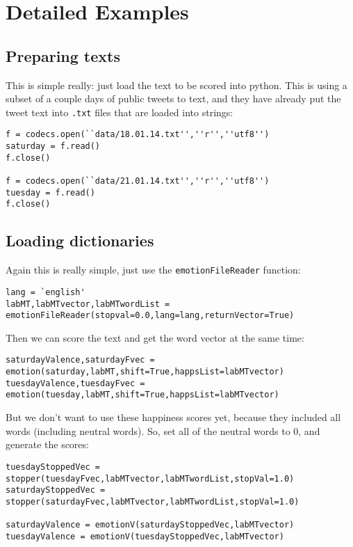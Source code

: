 \section{Detailed Examples}
\label{detailed-example::doc}\label{detailed-example:detailed-examples}

\subsection{Preparing texts}
\label{detailed-example:preparing-texts}
This is simple really: just load the text to be scored into python.
This is using a subset of a couple days of public tweets to text, and they have already put the tweet text into \lstinline{.txt} files that are loaded into strings:
\begin{lstlisting}
f = codecs.open(``data/18.01.14.txt'',''r'',''utf8'')
saturday = f.read()
f.close()

f = codecs.open(``data/21.01.14.txt'',''r'',''utf8'')
tuesday = f.read()
f.close()
\end{lstlisting}


\subsection{Loading dictionaries}
\label{detailed-example:loading-dictionaries}
Again this is really simple, just use the \lstinline{emotionFileReader} function:
\begin{lstlisting}
lang = `english'
labMT,labMTvector,labMTwordList = emotionFileReader(stopval=0.0,lang=lang,returnVector=True)
\end{lstlisting}

Then we can score the text and get the word vector at the same time:
\begin{lstlisting}
saturdayValence,saturdayFvec = emotion(saturday,labMT,shift=True,happsList=labMTvector)
tuesdayValence,tuesdayFvec = emotion(tuesday,labMT,shift=True,happsList=labMTvector)
\end{lstlisting}

But we don't want to use these happiness scores yet, because they included all words (including neutral words).
So, set all of the neutral words to 0, and generate the scores:
\begin{lstlisting}
tuesdayStoppedVec = stopper(tuesdayFvec,labMTvector,labMTwordList,stopVal=1.0)
saturdayStoppedVec = stopper(saturdayFvec,labMTvector,labMTwordList,stopVal=1.0)

saturdayValence = emotionV(saturdayStoppedVec,labMTvector)
tuesdayValence = emotionV(tuesdayStoppedVec,labMTvector)
\end{lstlisting}


